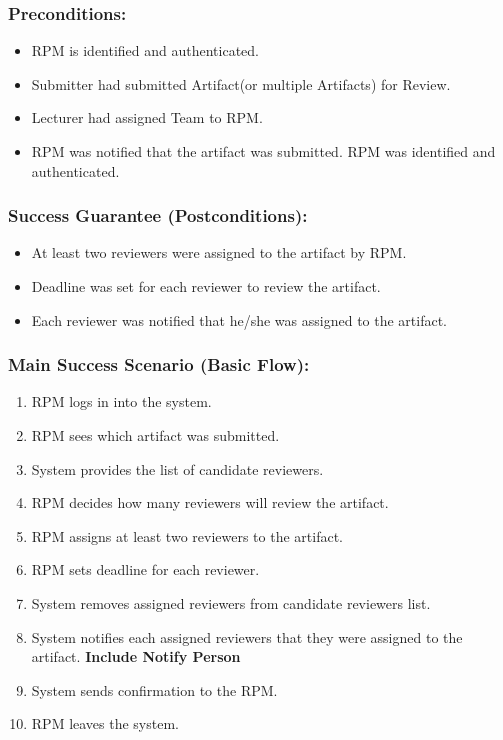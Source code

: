     
    \subsubsection*{\textbf{Preconditions:}}
    \begin{itemize}
    \itemsep-1em 
        \item RPM is identified and authenticated.
        \item Submitter had submitted Artifact(or multiple Artifacts) for Review.  
         \item Lecturer had assigned Team to RPM. 
        \item RPM was notified that the artifact was submitted.  RPM was identified and authenticated.
    \end{itemize}


    
    
    
    \subsubsection*{Success Guarantee (Postconditions):}
    \begin{itemize}
    \itemsep-1em 
       \item At least two reviewers were assigned to the artifact by RPM. 
       \item Deadline was set for each reviewer to review the artifact. 
        \item Each reviewer was notified that he/she was assigned to the artifact.
        
    \end{itemize}
    
    
    
    \subsubsection*{Main Success Scenario (Basic Flow):}
    \begin{enumerate}
        \itemsep-1em 
        
        \item RPM logs in into the system.
        \item RPM sees which artifact was submitted.
        \item  System provides the list of candidate reviewers.
        \item  RPM decides how many reviewers will review the artifact.
        \item  RPM assigns at least two reviewers to the artifact.
        \item  RPM sets deadline for each reviewer.
        \item  System removes assigned reviewers from candidate reviewers list.
        \item System notifies each assigned reviewers that they were assigned to the artifact.  \textbf{Include Notify Person}
        \item  System sends confirmation to the RPM.
        \item  RPM leaves the system.
        
    \end{enumerate}
    
